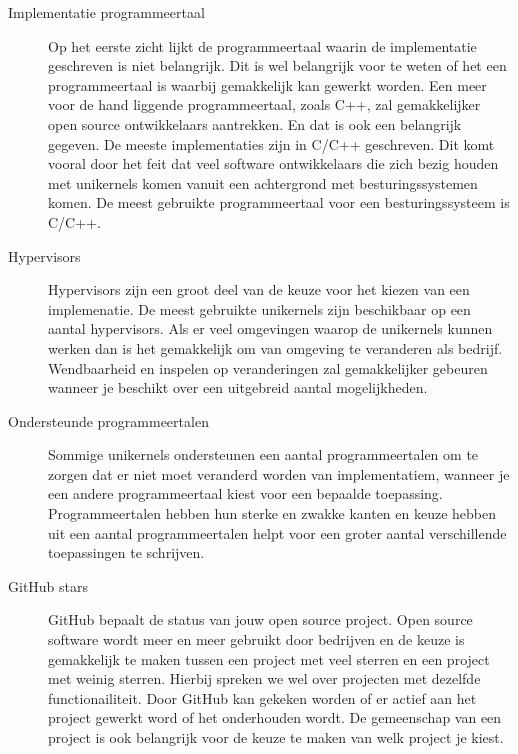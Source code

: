 \documentclass[pdftex,a4paper,12pt,twoside]{report}
\begin{document}
\begin{description}
\item [Implementatie programmeertaal]
Op het eerste zicht lijkt de programmeertaal waarin de implementatie geschreven is niet belangrijk. Dit is wel belangrijk voor te weten of het een programmeertaal is waarbij gemakkelijk kan gewerkt worden.
Een meer voor de hand liggende programmeertaal, zoals C++, zal gemakkelijker open source ontwikkelaars aantrekken. En dat is ook een belangrijk gegeven.
De meeste implementaties zijn in C/C++ geschreven. Dit komt vooral door het feit dat veel software ontwikkelaars die zich bezig houden met unikernels komen vanuit een achtergrond met besturingssystemen komen.
De meest gebruikte programmeertaal voor een besturingssysteem is C/C++.

\item [Hypervisors] 
Hypervisors zijn een groot deel van de keuze voor het kiezen van een implemenatie. De meest gebruikte unikernels zijn beschikbaar op een aantal hypervisors. Als er veel omgevingen waarop de unikernels kunnen werken dan is het gemakkelijk om van omgeving te veranderen als bedrijf. Wendbaarheid en inspelen op veranderingen zal gemakkelijker gebeuren wanneer je beschikt over een uitgebreid aantal mogelijkheden.

\item [Ondersteunde programmeertalen]
Sommige unikernels ondersteunen een aantal programmeertalen om te zorgen dat er niet moet veranderd worden van implementatiem, wanneer je een andere programmeertaal kiest voor een bepaalde toepassing.
Programmeertalen hebben hun sterke en zwakke kanten en keuze hebben uit een aantal programmeertalen helpt voor een groter aantal verschillende toepassingen te schrijven.

\item [GitHub stars] 
GitHub bepaalt de status van jouw open source project. Open source software wordt meer en meer gebruikt door bedrijven en de keuze is gemakkelijk te maken tussen een project met veel sterren en een project met weinig sterren. Hierbij spreken we wel over projecten met dezelfde functionailiteit. Door GitHub kan gekeken worden of er actief aan het project gewerkt word of het onderhouden wordt. De gemeenschap van een project is ook belangrijk voor de keuze te maken van welk project je kiest.

\end{description}
\end{document}
